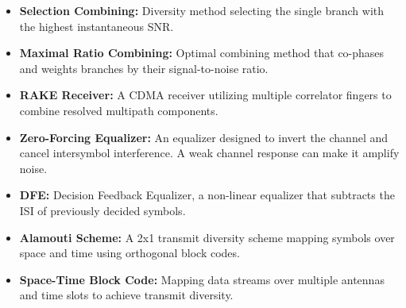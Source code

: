 \documentclass[12pt,a4paper]{article}
\begin{document}
\begin{tcolorbox}[defbox, title={\textbf{One-Line Definitions}}]
\begin{itemize}[leftmargin=*, itemsep=2.5pt, topsep=0pt]
  \item \textbf{Selection Combining:} Diversity method selecting the single branch with the highest instantaneous SNR.
  \item \textbf{Maximal Ratio Combining:} Optimal combining method that co-phases and weights branches by their signal-to-noise ratio.
  \item \textbf{RAKE Receiver:} A CDMA receiver utilizing multiple correlator fingers to combine resolved multipath components.
  \item \textbf{Zero-Forcing Equalizer:} An equalizer designed to invert the channel and cancel intersymbol interference. A weak channel response can make it amplify noise.
  \item \textbf{DFE:} Decision Feedback Equalizer, a non-linear equalizer that subtracts the ISI of previously decided symbols.
  \item \textbf{Alamouti Scheme:} A 2x1 transmit diversity scheme mapping symbols over space and time using orthogonal block codes.
  \item \textbf{Space-Time Block Code:} Mapping data streams over multiple antennas and time slots to achieve transmit diversity.
\end{itemize}
\end{tcolorbox}
\end{document}
